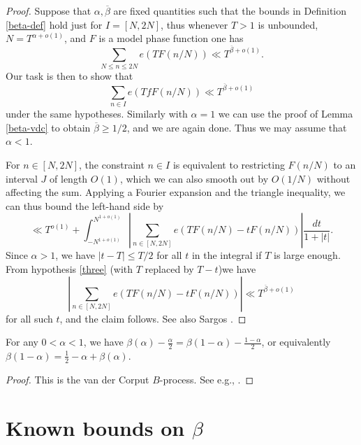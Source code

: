 \begin{proof}  Suppose that $\alpha, \overline{\beta}$ are fixed quantities such that the bounds in Definition \ref{beta-def} hold just for $I  = [N,2N]$, thus whenever $T>1$ is unbounded, $N = T^{\alpha+o(1)}$, and $F$ is a model phase function one has
\begin{equation}\label{three}
     \sum_{N \leq n \leq 2N} e(T F(n/N)) \ll T^{\overline{\beta}+o(1)}.
\end{equation}
Our task is then to show that
$$ \sum_{n \in I} e(T fF(n/N)) \ll T^{\overline{\beta}+o(1)}$$
under the same hypotheses. Similarly with $\alpha=1$ we can use the proof of Lemma \ref{beta-vdc} to obtain $\overline{\beta} \geq 1/2$, and we are again done.  Thus we may assume that $\alpha < 1$.

    For $n \in [N,2N]$, the constraint $n \in I$ is equivalent to restricting $F(n/N)$ to an interval $J$ of length $O(1)$, which we can also smooth out by $O(1/N)$ without affecting the sum.  Applying a Fourier expansion and the triangle inequality, we can thus bound the left-hand side by
$$ \ll T^{o(1)} + \int_{-N^{1+o(1)}}^{N^{1+o(1)}} \left|\sum_{n \in [N,2N]} e(T F(n/N) - t F(n/N)) \right| \frac{dt}{1+|t|}.$$
Since $\alpha > 1$, we have $|t-T| \leq T/2$ for all $t$ in the integral if $T$ is large enough.
From hypothesis \eqref{three} (with $T$ replaced by $T-t$)we have
$$ \left|\sum_{n \in [N,2N]} e(T F(n/N) - t F(n/N)) \right| \ll T^{\overline{\beta}+o(1)}$$
for all such $t$, and the claim follows. See also Sargos \cite[p 310]{sargos_points_1995}.
\end{proof}

\begin{lemma}[Reflection]\label{beta-reflect}  For any $0 < \alpha < 1$, we have $\beta(\alpha) - \frac{\alpha}{2} = \beta(1-\alpha) - \frac{1-\alpha}{2}$, or equivalently $\beta(1-\alpha) = \frac{1}{2} - \alpha + \beta(\alpha)$.
\end{lemma}

\begin{proof}  This is the van der Corput $B$-process. See e.g., \cite[p 370]{huxley_area_1996}.
\end{proof}

\section{Known bounds on \texorpdfstring{$\beta$}{beta}}


